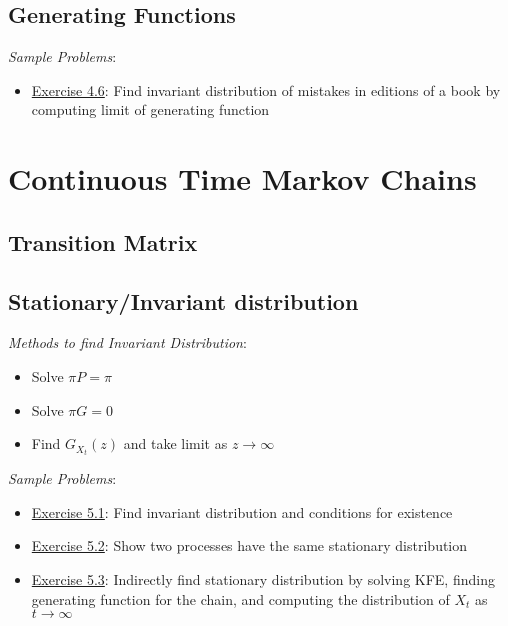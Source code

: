 \documentclass[12pt]{article}
\begin{document}
\subsection{Generating Functions}
\textit{Sample Problems}: 
\begin{itemize}[nolistsep]
    \item \hyperref[Exercise 4.6]{Exercise 4.6}: Find invariant distribution of mistakes in editions of a book by computing limit of generating function
\end{itemize}





\pagebreak
\section{Continuous Time Markov Chains}

\subsection{Transition Matrix}


\subsection{Stationary/Invariant distribution}
\textit{Methods to find Invariant Distribution}:
\begin{itemize}[nolistsep]
    \item Solve \( \pi P = \pi \)
    \item Solve \( \pi G = 0 \)
    \item Find \( G_{X_t}(z) \) and take limit as \( z\to\infty \) 
\end{itemize}

\textit{Sample Problems}: 
\begin{itemize}[nolistsep]
    \item \hyperref[Exercise 5.1]{Exercise 5.1}: Find invariant distribution and conditions for existence
    \item \hyperref[Exercise 5.2]{Exercise 5.2}: Show two processes have the same stationary distribution 
    \item \hyperref[Exercise 5.3]{Exercise 5.3}: Indirectly find stationary distribution by solving KFE, finding generating function for the chain, and computing the distribution of \( X_t \) as \( t\to\infty \)
\end{itemize}
\end{document}
